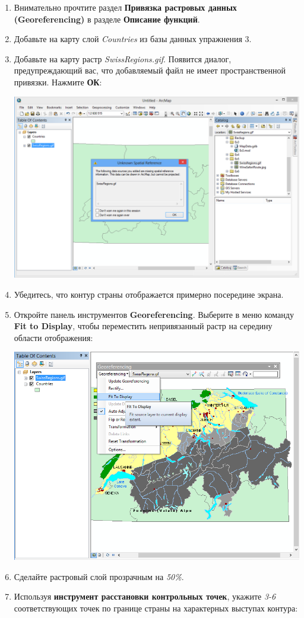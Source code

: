 \documentclass[]{book}
\theoremstyle{definition}
\theoremstyle{definition}
\theoremstyle{definition}
\theoremstyle{remark}
\begin{document}
\begin{enumerate}
\def\labelenumi{\arabic{enumi}.}
\item
  Внимательно прочтите раздел \textbf{Привязка растровых данных
  (Georeferencing)} в разделе \textbf{Описание функций}.
\item
  Добавьте на карту слой \emph{Countries} из базы данных упражнения 3.
\item
  Добавьте на карту растр \emph{SwissRegions.gif}. Появится диалог,
  предупреждающий вас, что добавляемый файл не имеет пространственной
  привязки. Нажмите \textbf{ОК}:

  \includegraphics{images/Ex05/image8.png}
\item
  Убедитесь, что контур страны отображается примерно посередине экрана.
\item
  Откройте панель инструментов \textbf{Georeferencing}. Выберите в меню
  команду \textbf{Fit to Display}, чтобы переместить непривязанный растр
  на середину области отображения:

  \includegraphics{images/Ex05/image9.png}
\item
  Сделайте растровый слой прозрачным на \emph{50\%}.
\item
  Используя \textbf{инструмент расстановки контрольных точек}, укажите
  \emph{3-6} соответствующих точек по границе страны на характерных
  выступах контура:


\end{enumerate}
\end{document}
